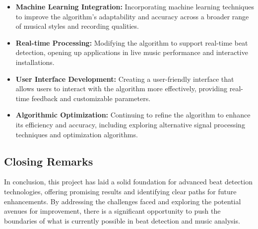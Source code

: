 \begin{itemize}
    \item \textbf{Machine Learning Integration:} Incorporating machine learning techniques to improve the algorithm's adaptability and accuracy across a broader range of musical styles and recording qualities.
    \item \textbf{Real-time Processing:} Modifying the algorithm to support real-time beat detection, opening up applications in live music performance and interactive installations.
    \item \textbf{User Interface Development:} Creating a user-friendly interface that allows users to interact with the algorithm more effectively, providing real-time feedback and customizable parameters.
    \item \textbf{Algorithmic Optimization:} Continuing to refine the algorithm to enhance its efficiency and accuracy, including exploring alternative signal processing techniques and optimization algorithms.
\end{itemize}

\subsection{Closing Remarks}

In conclusion, this project has laid a solid foundation for advanced beat detection technologies, offering promising results and identifying clear paths for future enhancements. By addressing the challenges faced and exploring the potential avenues for improvement, there is a significant opportunity to push the boundaries of what is currently possible in beat detection and music analysis.
